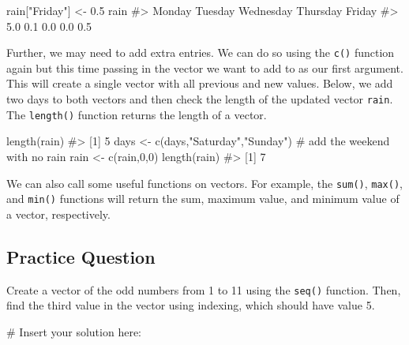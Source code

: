 \documentclass[
  letterpaper,
]{krantz}
\makeatletter
\newenvironment{Shaded}{\begin{snugshade}}{\end{snugshade}}
\newcommand{\CommentTok}[1]{\textcolor[rgb]{0.37,0.37,0.37}{#1}}
\newcommand{\DecValTok}[1]{\textcolor[rgb]{0.68,0.00,0.00}{#1}}
\newcommand{\FloatTok}[1]{\textcolor[rgb]{0.68,0.00,0.00}{#1}}
\newcommand{\FunctionTok}[1]{\textcolor[rgb]{0.28,0.35,0.67}{#1}}
\newcommand{\NormalTok}[1]{\textcolor[rgb]{0.00,0.23,0.31}{#1}}
\newcommand{\OtherTok}[1]{\textcolor[rgb]{0.00,0.23,0.31}{#1}}
\newcommand{\StringTok}[1]{\textcolor[rgb]{0.13,0.47,0.30}{#1}}
\newenvironment{kframe}{%
\medskip{}
\setlength{\fboxsep}{.8em}
 \def\at@end@of@kframe{}%
 \ifinner\ifhmode%
  \def\at@end@of@kframe{\end{minipage}}%
  \begin{minipage}{\columnwidth}%
 \fi\fi%
 \def\FrameCommand##1{\hskip\@totalleftmargin \hskip-\fboxsep
 \colorbox{shadecolor}{##1}\hskip-\fboxsep
     \hskip-\linewidth \hskip-\@totalleftmargin \hskip\columnwidth}%
 \MakeFramed {\advance\hsize-\width
   \@totalleftmargin\z@ \linewidth\hsize
   \@setminipage}}%
 {\par\unskip\endMakeFramed%
 \at@end@of@kframe}
\renewenvironment{Shaded}{\begin{kframe}}{\end{kframe}}
\makeatother
\begin{document}
\begin{Shaded}
\begin{Highlighting}[]
\NormalTok{rain[}\StringTok{"Friday"}\NormalTok{] }\OtherTok{\textless{}{-}} \FloatTok{0.5}
\NormalTok{rain}
\CommentTok{\#\textgreater{}    Monday   Tuesday Wednesday  Thursday    Friday }
\CommentTok{\#\textgreater{}       5.0       0.1       0.0       0.0       0.5}
\end{Highlighting}
\end{Shaded}

Further, we may need to add extra entries. We can do so using the
\texttt{c()} function again but this time passing in the vector we want
to add to as our first argument. This will create a single vector with
all previous and new values. Below, we add two days to both vectors and
then check the length of the updated vector \texttt{rain}. The
\texttt{length()} function returns the length of a vector.

\begin{Shaded}
\begin{Highlighting}[]
\FunctionTok{length}\NormalTok{(rain)}
\CommentTok{\#\textgreater{} [1] 5}
\NormalTok{days }\OtherTok{\textless{}{-}} \FunctionTok{c}\NormalTok{(days,}\StringTok{"Saturday"}\NormalTok{,}\StringTok{"Sunday"}\NormalTok{) }\CommentTok{\# add the weekend with no rain}
\NormalTok{rain }\OtherTok{\textless{}{-}} \FunctionTok{c}\NormalTok{(rain,}\DecValTok{0}\NormalTok{,}\DecValTok{0}\NormalTok{)}
\FunctionTok{length}\NormalTok{(rain)}
\CommentTok{\#\textgreater{} [1] 7}
\end{Highlighting}
\end{Shaded}

We can also call some useful functions on vectors. For example, the
\texttt{sum()}, \texttt{max()}, and \texttt{min()} functions will return
the sum, maximum value, and minimum value of a vector, respectively.

\hypertarget{practice-question}{%
\subsection{Practice Question}\label{practice-question}}

Create a vector of the odd numbers from 1 to 11 using the \texttt{seq()}
function. Then, find the third value in the vector using indexing, which
should have value 5.

\begin{Shaded}
\begin{Highlighting}[]
\CommentTok{\# Insert your solution here:}
\end{Highlighting}
\end{Shaded}
\end{document}
